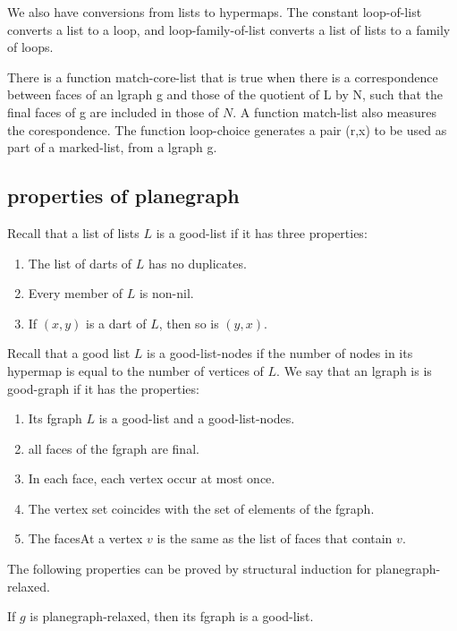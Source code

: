 \bigskip
We also have conversions from lists to hypermaps.  The constant loop-of-list converts a list to a loop,
and loop-family-of-list converts a list of lists to a family of loops.

There is a function match-core-list that is true when there is a correspondence between
faces of an lgraph g and those of the quotient of L by N, such that the final faces of g are included in those of $N$.
A function match-list also measures the corespondence.  The function loop-choice generates a pair (r,x)
to be used as part of a marked-list, from a lgraph g.





\subsection{properties of planegraph}

\begin{definition}
Recall that a list of lists $L$ is a good-list if it has three properties:
\begin{enumerate}
\item The list of darts of $L$ has no duplicates.
\item Every member of $L$ is non-nil.
\item If $(x,y)$ is a dart of $L$, then so is $(y,x)$.
\end{enumerate}
Recall that a good list $L$ is a good-list-nodes if 
the number of nodes in its hypermap is equal to the number
of vertices of $L$.
We say that an lgraph is is good-graph if it has the properties:
\begin{enumerate}
\item Its fgraph $L$ is a good-list and a good-list-nodes.
\item all faces of the fgraph are final.
\item In each face, each vertex occur at most once.
\item The vertex set coincides with the set of elements of the fgraph.
\item The facesAt a vertex $v$ is the same as the list of faces that contain $v$.
\end{enumerate}
\end{definition}

The following properties can be proved by structural induction
for planegraph-relaxed.

\begin{lemma} 
If $g$ is planegraph-relaxed, then its fgraph is a good-list.
\end{lemma}  
 


